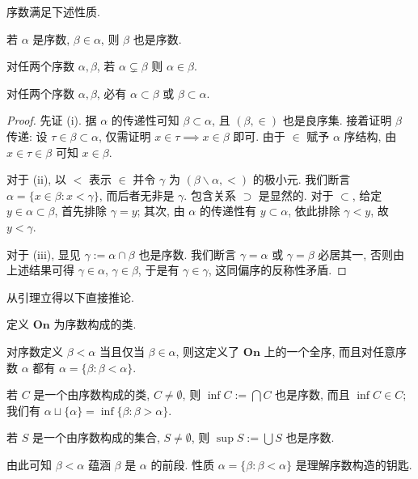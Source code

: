 \begin{lemma}\label{prop:ordinal-property}
	序数满足下述性质.
	\begin{compactenum}[(i)]
		\item 若 $\alpha$ 是序数, $\beta \in \alpha$, 则 $\beta$ 也是序数.
		\item 对任两个序数 $\alpha, \beta$, 若 $\alpha \subsetneq \beta$ 则 $\alpha \in \beta$.
		\item 对任两个序数 $\alpha, \beta$, 必有 $\alpha \subset \beta$ 或 $\beta \subset \alpha$.
	\end{compactenum}
\end{lemma}
\begin{proof}
	先证 (i). 据 $\alpha$ 的传递性可知 $\beta \subset \alpha$, 且 $(\beta, \in)$ 也是良序集. 接着证明 $\beta$ 传递: 设 $\tau \in \beta \subset \alpha$,  仅需证明 $x \in \tau \implies x \in \beta$ 即可. 由于 $\in$ 赋予 $\alpha$ 序结构, 由 $x \in \tau \in \beta$ 可知 $x \in \beta$.

	对于 (ii), 以 $<$ 表示 $\in$ 并令 $\gamma$ 为 $(\beta \smallsetminus \alpha, <)$ 的极小元. 我们断言 $\alpha = \{x \in \beta : x < \gamma \}$, 而后者无非是 $\gamma$. 包含关系 $\supset$ 是显然的. 对于 $\subset$, 给定 $y \in \alpha \subset \beta$, 首先排除 $\gamma = y$; 其次, 由 $\alpha$ 的传递性有 $y \subset \alpha$, 依此排除 $\gamma < y$, 故 $y < \gamma$.

	对于 (iii), 显见 $\gamma := \alpha \cap \beta$ 也是序数. 我们断言 $\gamma = \alpha$ 或 $\gamma = \beta$ 必居其一, 否则由上述结果可得 $\gamma \in \alpha$, $\gamma \in \beta$, 于是有 $\gamma \in \gamma$, 这同偏序的反称性矛盾.
\end{proof}

从引理立得以下直接推论.
\begin{theorem}\label{prop:On-wellorder}
	定义 $\textbf{On}$ 为序数构成的类. 
	\begin{compactitem}
		\item 对序数定义 $\beta < \alpha$ 当且仅当 $\beta \in \alpha$, 则这定义了 $\textbf{On}$ 上的一个全序, 而且对任意序数 $\alpha$ 都有 $\alpha = \{ \beta : \beta < \alpha \}$.
		\item 若 $C$ 是一个由序数构成的类, $C \neq \emptyset$, 则 $\inf C := \bigcap C$ 也是序数, 而且 $\inf C \in C$; 我们有 $\alpha \sqcup \{\alpha\} = \inf\{ \beta: \beta > \alpha \}$.
		\item 若 $S$ 是一个由序数构成的集合, $S \neq \emptyset$, 则 $\sup S := \bigcup S$ 也是序数.
	\end{compactitem}
\end{theorem}
由此可知 $\beta < \alpha$ 蕴涵 $\beta$ 是 $\alpha$ 的前段. 性质 $\alpha = \{\beta: \beta < \alpha \}$ 是理解序数构造的钥匙.

